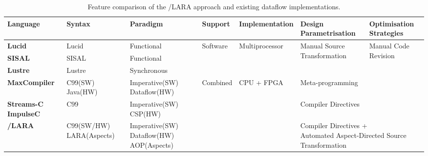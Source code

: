 \begin{table}
  \renewcommand{\arraystretch}{2.1}
  \centering
  \label{table:feature-comparison}
  \begin{tabularx}{\textwidth}{ m{2.5cm} | p{2.5cm} | p{3cm} | p{1.9cm}| p{2.8cm} | p{3.2cm} | p{2.5cm}}
    \hline
    \bf{Language}                 & \bf{Syntax}              & \bf{Paradigm}                            & \bf{Support}              & \bf{Implementation}             & \bf{Design Parametrisation}                     & \bf{Optimisation Strategies}            \\
    \hline \hline
    \bf{Lucid}                    & Lucid                    & Functional                               & \multirow{3}{*}{Software} & \multirow{3}{*}{Multiprocessor} & \multirow{3}{3cm}{Manual Source Transformation} & \multirow{5}{3cm}{Manual Code Revision} \\
    \cline{1-3}
    \bf{SISAL}                    & SISAL                    & Functional                               &                           &                                 &                                                 &                                         \\
    \cline{1-3}
    \bf{Lustre}                   & Lustre                   & Synchronous                              &                           &                                 &                                                 &                                         \\
    \cline{1-6}
    \bf{MaxCompiler}              & C99(SW) Java(HW)         & Imperative(SW) Dataflow(HW)              & \multirow{6}{*}{Combined} & \multirow{6}{*}{CPU + FPGA}     & Meta-programming                                &                                         \\
    \cline{1-3}\cline{6}
    \bf{Streams-C} \bf{ImpulseC}\ & C99                      & Imperative(SW) CSP(HW)                   &                           &                                 & Compiler \newline Directives                    &                                         \\
    \cline{1-3}\cline{6-7}
    \bf{\FAST{}}/\bf{LARA}        & C99(SW/HW) LARA(Aspects) & Imperative(SW) Dataflow(HW) AOP(Aspects) &                           &                                 & \multicolumn{2}{p{5.5cm}}{Compiler Directives + \newline Automated Aspect-Directed Source Transformation} \\
  \end{tabularx}
  \caption{Feature comparison of the \FAST{}/LARA approach and existing dataflow implementations.}
\end{table}


